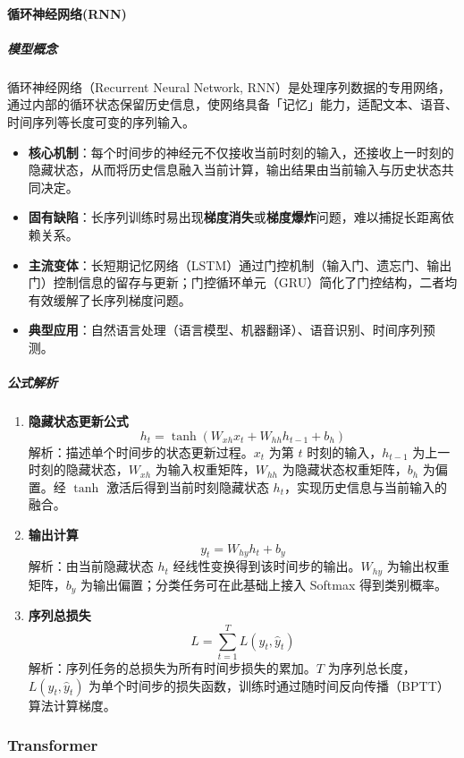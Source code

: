 \documentclass[12pt]{article}
\begin{document}
\paragraph{循环神经网络(RNN)}
\subparagraph{模型概念}
循环神经网络（Recurrent Neural Network, RNN）是处理序列数据的专用网络，通过内部的循环状态保留历史信息，使网络具备「记忆」能力，适配文本、语音、时间序列等长度可变的序列输入。
\begin{itemize}
    \item \textbf{核心机制}：每个时间步的神经元不仅接收当前时刻的输入，还接收上一时刻的隐藏状态，从而将历史信息融入当前计算，输出结果由当前输入与历史状态共同决定。
    \item \textbf{固有缺陷}：长序列训练时易出现\textbf{梯度消失}或\textbf{梯度爆炸}问题，难以捕捉长距离依赖关系。
    \item \textbf{主流变体}：长短期记忆网络（LSTM）通过门控机制（输入门、遗忘门、输出门）控制信息的留存与更新；门控循环单元（GRU）简化了门控结构，二者均有效缓解了长序列梯度问题。
    \item \textbf{典型应用}：自然语言处理（语言模型、机器翻译）、语音识别、时间序列预测。
\end{itemize}

\subparagraph{公式解析}
\begin{enumerate}
    \item \textbf{隐藏状态更新公式}
    \[
    h_t = \tanh\left(W_{xh} x_t + W_{hh} h_{t-1} + b_h\right)
    \]
    解析：描述单个时间步的状态更新过程。$x_t$ 为第 $t$ 时刻的输入，$h_{t-1}$ 为上一时刻的隐藏状态，$W_{xh}$ 为输入权重矩阵，$W_{hh}$ 为隐藏状态权重矩阵，$b_h$ 为偏置。经 $\tanh$ 激活后得到当前时刻隐藏状态 $h_t$，实现历史信息与当前输入的融合。

    \item \textbf{输出计算}
    \[
    y_t = W_{hy} h_t + b_y
    \]
    解析：由当前隐藏状态 $h_t$ 经线性变换得到该时间步的输出。$W_{hy}$ 为输出权重矩阵，$b_y$ 为输出偏置；分类任务可在此基础上接入 Softmax 得到类别概率。

    \item \textbf{序列总损失}
    \[
    L = \sum_{t=1}^T L(y_t, \hat{y}_t)
    \]
    解析：序列任务的总损失为所有时间步损失的累加。$T$ 为序列总长度，$L(y_t, \hat{y}_t)$ 为单个时间步的损失函数，训练时通过随时间反向传播（BPTT）算法计算梯度。
\end{enumerate}

\subsubsection{Transformer}
\end{document}
